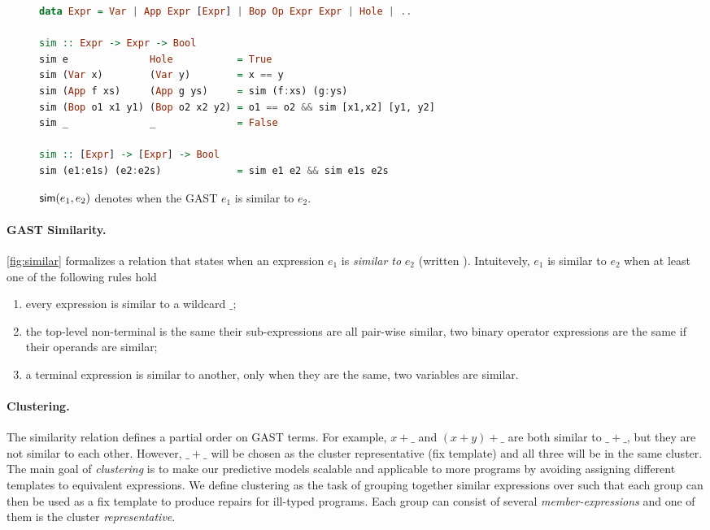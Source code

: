 \label{subsec:clustering}
\begin{figure*}
\begin{minipage}{\textwidth}
\begin{lstlisting}[language=haskell, frame=single]
data Expr = Var | App Expr [Expr] | Bop Op Expr Expr | Hole | ..

sim :: Expr -> Expr -> Bool
sim e              Hole           = True
sim (Var x)        (Var y)        = x == y
sim (App f xs)     (App g ys)     = sim (f:xs) (g:ys)
sim (Bop o1 x1 y1) (Bop o2 x2 y2) = o1 == o2 && sim [x1,x2] [y1, y2]
sim _              _              = False

sim :: [Expr] -> [Expr] -> Bool
sim (e1:e1s) (e2:e2s)             = sim e1 e2 && sim e1s e2s
\end{lstlisting}
\end{minipage}
\caption{$\mathsf{sim}(e_1, e_2)$ denotes when the GAST $e_1$ is similar to $e_2$.} 
\label{fig:similar}
\end{figure*}

\paragraph{GAST Similarity.}
%
\autoref{fig:similar} formalizes a relation that states when 
an expression $e_1$ is \emph{similar to} $e_2$  (written ).
%
Intuitevely, $e_1$ is similar to $e_2$ when at least one
of the following rules hold
\begin{enumerate}
    \item every expression is similar to a wildcard $\_$;

    \item the top-level non-terminal is the same their 
          sub-expressions are all pair-wise similar, \eg 
          two binary operator expressions are the same 
          if their operands are similar;

    \item a terminal expression is similar to another, only when 
    they are the same, \eg two variables are similar.
\end{enumerate}
%

\paragraph{Clustering.}
The similarity relation defines a partial order on GAST 
terms. For example, $x + \_$ and $(x + y) + \_$ are both 
similar to $\_ + \_$, but they are not similar to each other. 
%
However, $\_ + \_$ will be chosen as the cluster representative 
(fix template) and all three will be in the same cluster.
%
The main goal of \emph{clustering} is to make our predictive models scalable and
applicable to more programs by avoiding assigning different templates to
equivalent expressions. We define clustering as the task of grouping together
similar expressions over \repairLang such that each group can then be used as a
fix template to produce repairs for ill-typed programs. Each group can consist
of several \emph{member-expressions} and one of them is the cluster
\emph{representative}.


